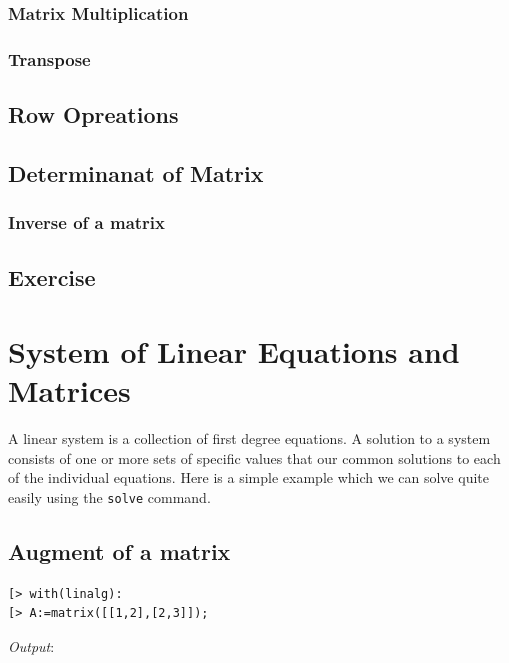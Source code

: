 \documentclass[
]{book}
\theoremstyle{definition}
\theoremstyle{definition}
\theoremstyle{definition}
\theoremstyle{definition}
\theoremstyle{remark}
\begin{document}
\subsection{Matrix Multiplication}\label{matrix-multiplication}

\subsection{Transpose}\label{transpose}

\section{Row Opreations}\label{row-opreations}

\section{Determinanat of Matrix}\label{determinanat-of-matrix}

\subsection{Inverse of a matrix}\label{inverse-of-a-matrix}

\section{Exercise}\label{exercise-4}

\chapter{System of Linear Equations and Matrices}\label{system-of-linear-equations-and-matrices}

A linear system is a collection of first degree equations. A solution to a system consists of one or more sets of specific values that our common solutions to each of the individual equations. Here is a simple example which we can solve quite easily using the \texttt{solve} command.

\section{Augment of a matrix}\label{augment-of-a-matrix}

\begin{verbatim}
[> with(linalg):
[> A:=matrix([[1,2],[2,3]]);
\end{verbatim}

\emph{Output}:
\end{document}
